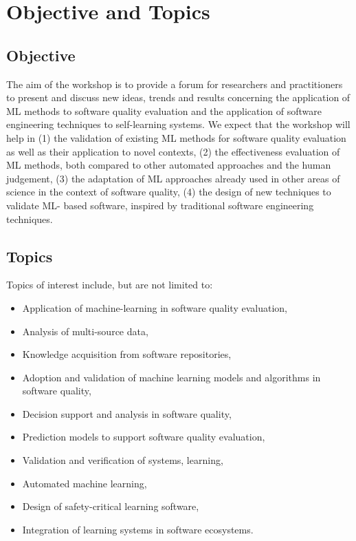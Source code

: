 \section{Objective and Topics}
\label{sec:objective}
\subsection{Objective}
The aim of the workshop is to provide a forum for researchers and practitioners to present and discuss new ideas, trends and results concerning the application of ML methods to software quality evaluation and the application of software engineering techniques to self-learning systems. We expect that the workshop will help in (1) the validation of existing ML methods for software quality evaluation as well as their application to novel contexts, (2) the effectiveness evaluation of ML methods, both compared to other automated approaches and the human judgement, (3) the adaptation of ML approaches already used in other areas of science in the context of software quality, (4) the design of new techniques to validate ML- based software, inspired by traditional software engineering techniques.
\subsection{Topics}
Topics of interest include, but are not limited to:
\begin{itemize}
\item Application of machine-learning in software quality evaluation,\smallskip
\item Analysis of multi-source data,\smallskip
\item Knowledge acquisition from software repositories,\smallskip
\item Adoption and validation of machine learning models and algorithms in software quality,\smallskip
\item Decision support and analysis in software quality,\smallskip
\item Prediction models to support software quality evaluation,\smallskip
\item Validation and verification of systems, learning,\smallskip
\item Automated machine learning,\smallskip
\item Design of safety-critical learning software,\smallskip
\item Integration of learning systems in software ecosystems.
\end{itemize}